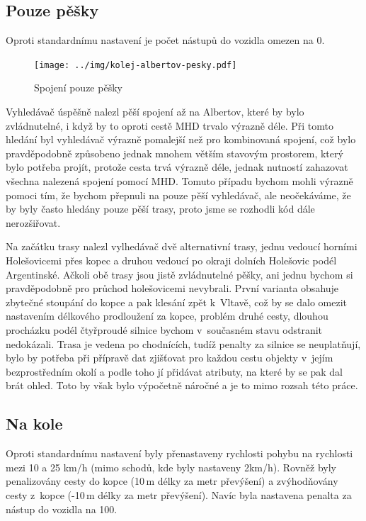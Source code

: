 \subsection{Pouze pěšky}
Oproti standardnímu nastavení je počet nástupů do vozidla omezen na 0.
\begin{figure}[h]
  \centering
    \texttt{[image: ../img/kolej-albertov-pesky.pdf]}
  \caption{Spojení pouze pěšky}
  \label{fig:kolej-albertov-pesky}
\end{figure}

Vyhledávač úspěšně nalezl pěší spojení až na Albertov, které by bylo
zvládnutelné, i když by to oproti cestě MHD trvalo výrazně déle. Při tomto
hledání byl vyhledávač výrazně pomalejší než pro kombinovaná spojení, což bylo
pravděpodobně způsobeno jednak mnohem větším stavovým prostorem, který bylo
potřeba projít, protože cesta trvá výrazně déle, jednak nutností zahazovat
všechna nalezená spojení pomocí MHD. Tomuto případu bychom mohli výrazně pomoci
tím, že bychom přepnuli na pouze pěší vyhledávač, ale neočekáváme, že by byly
často hledány pouze pěší trasy, proto jsme se rozhodli kód dále nerozšiřovat.

Na začátku trasy nalezl vylhedávač dvě alternativní trasy, jednu vedoucí horními
Holešovicemi přes kopec a druhou vedoucí po okraji dolních Holešovic podél
Argentinské. Ačkoli obě trasy jsou jistě zvládnutelné pěšky, ani jednu bychom si
pravděpodobně pro průchod holešovicemi nevybrali. První varianta obsahuje
zbytečné stoupání do kopce a pak klesání zpět k~Vltavě, což by se dalo omezit
nastavením délkového prodloužení za kopce, problém druhé cesty, dlouhou
procházku podél čtyřproudé silnice bychom v~současném stavu odstranit
nedokázali. Trasa je vedena po chodnících, tudíž penalty za silnice se
neuplatňují, bylo by potřeba při přípravě dat zjišťovat pro každou cestu objekty
v~jejím bezprostředním okolí a podle toho jí přidávat atributy, na které by se
pak dal brát ohled. Toto by však bylo výpočetně náročné a je to mimo rozsah této
práce.

\subsection{Na kole}
Oproti standardnímu nastavení byly přenastaveny rychlosti pohybu na rychlosti
mezi 10 a 25 km/h (mimo schodů, kde byly nastaveny 2km/h). Rovněž byly
penalizovány cesty do kopce (10\,m délky za metr převýšení) a zvýhodňovány cesty
z~kopce (-10\,m délky za metr převýšení). Navíc byla nastavena penalta za nástup
do vozidla na 100.

